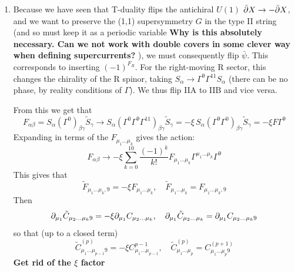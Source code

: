 \documentclass[11pt, class=article, crop=false]{standalone}
\begin{document}
\begin{enumerate}
	The twisted sector contributes too. From the definition of $\bar Z_{E_8}\twist hg$, inserting $(-1)^\delta$ flips the sign of $\bar \theta_4^8$, so $\bar Z_{E_8}\twist 1g = V_{16} \pm C_{16}$: the right-moving ground states are now the vector or the other spinor of each $\mathrm{O}(16)$. On the left the phases reverse the GSO projection, so $O_8$ and $C_8$ appear instead of $V_8$ and $S_8$. The $O_8$ vacuum has $L_0 = 0$ and cannot be level-matched to anything on the right, whose lowest weight is now $\frac32$, so there is no tachyon. The surviving massless states are $(16, 16)$ paired with $C_8$: fermions of the opposite chirality to the untwisted ones. Together the two sectors give exactly the chiral, anomaly-free spectrum used in problem 7.31.
	
	\item Because we have seen that T-duality flips the antichiral $U(1)$ $\bar {\partial} X \to -\bar {\partial} X$, and we want to preserve the (1,1) supersymmetry $G$ in the type II string (and so must keep it as a periodic variable \textbf{Why is this absolutely necessary. Can we not work with double covers in some clever way when defining supercurrents?} ), we must consequently flip $\bar \psi$. This corresponds to inserting $(-1)^{F_R}$. For the right-moving R sector, this changes the chirality of the R spinor, taking $S_\alpha \to \Gamma^9 \Gamma^{11} S_\alpha$ (there can be no phase, by reality conditions of $\Gamma$). We thus flip IIA to IIB and vice versa.
	
	From this we get that 
	\[
		F_{\alpha \beta} = S_{\alpha} (\Gamma^{0})_{\beta \gamma} \tilde S_\gamma \to S_{\alpha} (\Gamma^{0} \Gamma^{9} \Gamma^{11})_{\beta \gamma} \tilde S_\gamma = - \xi \, S_{\alpha} (\Gamma^{9} \Gamma^{0})_{\beta \gamma} \tilde S_\gamma = - \xi F \Gamma^{9}
	\]
	Expanding in terms of the $F_{\mu_1 \dots \mu_k}$ gives the action:
	\[
		F_{\alpha \beta} \to - \xi \sum_{k=0}^{10} \frac{(-1)^k}{k!} F_{\mu_1 \dots \mu_k} \Gamma^{\mu_1 \dots \mu_k} \Gamma^{9}
	\]
	This gives that
	\[
		\tilde F_{\mu_1 \dots \mu_k, 9} = - \xi F_{\mu_1 \dots \mu_k}, \quad \tilde F_{\mu_1 \dots \mu_k} = F_{\mu_1 \dots \mu_k, 9}
	\]
	Then
	\[
		\partial_{\mu_1} \tilde C_{\mu_2 \dots \mu_k 9} = -\xi \partial_{\mu_1} C_{\mu_2 \dots \mu_k}, \quad \partial_{\mu_1} \tilde C_{\mu_2 \dots \mu_k} = \partial_{\mu_1} C_{\mu_2 \dots \mu_k 9}
	\]
	so that (up to a closed term)
	\[
		\tilde C_{\mu_1 \dots \mu_{p-1} 9}^{(p)} = -\xi C_{\mu_1 \dots \mu_{p-1}}^{p-1}, \quad \tilde C^{(p)}_{\mu_1 \dots \mu_p} = C^{(p+1)}_{\mu_1 \dots \mu_p 9}
	\]
	\textbf{Get rid of the $\xi$ factor}
	

\end{enumerate}
\end{document}
